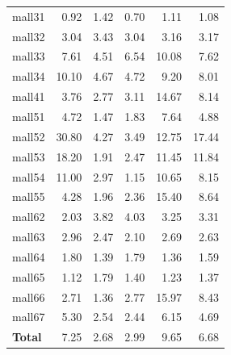 \begin{table}[htbp]
\begin{tabular}{lrrrrr}
    mall31 & 0.92 & 1.42 & 0.70 & 1.11 & 1.08 \\
    mall32 & 3.04 & 3.43 & 3.04 & 3.16 & 3.17 \\
    mall33 & 7.61 & 4.51 & 6.54 & 10.08 & 7.62 \\
    mall34 & 10.10 & 4.67 & 4.72 & 9.20 & 8.01 \\
    mall41 & 3.76 & 2.77 & 3.11 & 14.67 & 8.14 \\
    mall51 & 4.72 & 1.47 & 1.83 & 7.64 & 4.88 \\
    mall52 & 30.80 & 4.27 & 3.49 & 12.75 & 17.44 \\
    mall53 & 18.20 & 1.91 & 2.47 & 11.45 & 11.84 \\
    mall54 & 11.00 & 2.97 & 1.15 & 10.65 & 8.15 \\
    mall55 & 4.28 & 1.96 & 2.36 & 15.40 & 8.64 \\
    mall62 & 2.03 & 3.82 & 4.03 & 3.25 & 3.31 \\
    mall63 & 2.96 & 2.47 & 2.10 & 2.69 & 2.63 \\
    mall64 & 1.80 & 1.39 & 1.79 & 1.36 & 1.59 \\
    mall65 & 1.12 & 1.79 & 1.40 & 1.23 & 1.37 \\
    mall66 & 2.71 & 1.36 & 2.77 & 15.97 & 8.43 \\
    mall67 & 5.30 & 2.54 & 2.44 & 6.15 & 4.69 \\
    \midrule
    \textbf{Total} & 7.25 & 2.68 & 2.99 & 9.65 & 6.68 \\
    \bottomrule
  \end{tabular}
\end{table}
